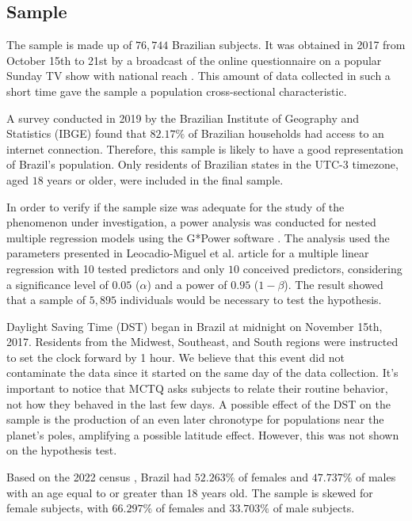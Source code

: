 \documentclass[
12pt,
openright,
oneside,
a4paper,
chapter=TITLE,
section=TITLE,
french,
spanish,
brazil,
english
]{abntex2}\usepackage{array}
\begin{document}
\subsection{Sample}\label{sample}

The sample is made up of \(76,744\) Brazilian subjects. It was obtained
in 2017 from October 15th to 21st by a broadcast of the online
questionnaire on a popular Sunday TV show with national reach
\autocite{redeglobo2017}. This amount of data collected in such a short
time gave the sample a population cross-sectional characteristic.

A survey conducted in 2019 by the Brazilian Institute of Geography and
Statistics (IBGE) \autocite*{ibge2021} found that \(82.17\%\) of
Brazilian households had access to an internet connection. Therefore,
this sample is likely to have a good representation of Brazil's
population. Only residents of Brazilian states in the UTC-3 timezone,
aged \(18\) years or older, were included in the final sample.

In order to verify if the sample size was adequate for the study of the
phenomenon under investigation, a power analysis was conducted for
nested multiple regression models using the G*Power software
\autocite{faul2007}. The analysis used the parameters presented in
Leocadio-Miguel et al. \autocite*{leocadio-miguel2017} article for a
multiple linear regression with 10 tested predictors and only \(10\)
conceived predictors, considering a significance level of \(0.05\)
(\(\alpha\)) and a power of \(0.95\) (\(1 - \beta\)). The result showed
that a sample of \(5,895\) individuals would be necessary to test the
hypothesis.

Daylight Saving Time (DST) began in Brazil at midnight on November 15th,
2017. Residents from the Midwest, Southeast, and South regions were
instructed to set the clock forward by 1 hour. We believe that this
event did not contaminate the data since it started on the same day of
the data collection. It's important to notice that MCTQ asks subjects to
relate their routine behavior, not how they behaved in the last few
days. A possible effect of the DST on the sample is the production of an
even later chronotype for populations near the planet's poles,
amplifying a possible latitude effect. However, this was not shown on
the hypothesis test.

Based on the 2022 census \autocite{ibgea}, Brazil had \(52.263\%\) of
females and \(47.737\%\) of males with an age equal to or greater than
18 years old. The sample is skewed for female subjects, with
\(66.297\%\) of females and \(33.703\%\) of male subjects.
\end{document}
